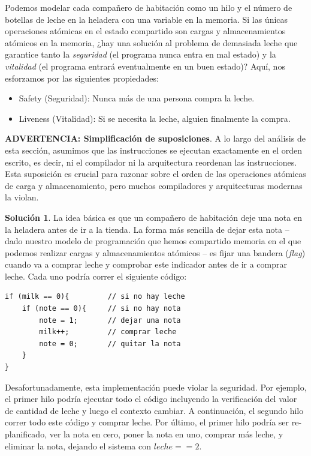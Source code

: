 \documentclass[10pt]{book}
\begin{document}
Podemos modelar cada compañero de habitación como un hilo y el número de botellas de leche en la heladera con una variable en la memoria. Si las únicas operaciones atómicas en el estado compartido son cargas y almacenamientos atómicos en la memoria, ¿hay una solución al problema de demasiada leche que garantice tanto la \textit{seguridad} (el programa nunca entra en mal estado) y la \textit{vitalidad} (el programa entrará eventualmente en un buen estado)? Aquí, nos esforzamos por las siguientes propiedades:
\begin{itemize}
\item Safety (Seguridad): Nunca más de una persona compra la leche.
\item Liveness (Vitalidad): Si se necesita la leche, alguien finalmente la compra.
\end{itemize}

\textbf{ADVERTENCIA: Simplificación de suposiciones}. A lo largo del análisis de esta sección, asumimos que las instrucciones se ejecutan exactamente en el orden escrito, es decir, ni el compilador ni la arquitectura reordenan las instrucciones. Esta suposición es crucial para razonar sobre el orden de las operaciones atómicas de carga y almacenamiento, pero muchos compiladores y arquitecturas modernas la violan.

\textbf{Solución 1}. La idea básica es que un compañero de habitación deje una nota en la heladera antes de ir a la tienda. La forma más sencilla de dejar esta nota -- dado nuestro modelo de programación que hemos compartido memoria en el que podemos realizar cargas y almacenamientos atómicos -- es fijar una bandera (\textit{flag}) cuando va a comprar leche y comprobar este indicador antes de ir a comprar leche. Cada uno podría correr el siguiente código:


\begin{lstlisting}
if (milk == 0){			// si no hay leche
	if (note == 0){		// si no hay nota
		note = 1;		// dejar una nota
		milk++;			// comprar leche
		note = 0;		// quitar la nota
	}
}
\end{lstlisting}

Desafortunadamente, esta implementación puede violar la seguridad. Por ejemplo, el primer hilo podría ejecutar todo el código incluyendo la verificación del valor de cantidad de leche y luego el contexto cambiar. A continuación, el segundo hilo correr todo este código y comprar leche. Por último, el primer hilo podría ser re-planificado, ver la nota en cero, poner la nota en uno, comprar más leche, y eliminar la nota, dejando el sistema con $leche == 2$.
\end{document}
